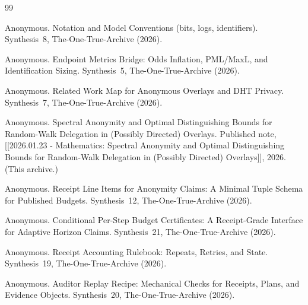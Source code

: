 \documentclass[11pt]{article}
\begin{document}
\begin{thebibliography}{99}\small

Anonymous.
\newblock Notation and Model Conventions (bits, logs, identifiers).
\newblock Synthesis~8, The-One-True-Archive (2026).


Anonymous.
\newblock Endpoint Metrics Bridge: Odds Inflation, PML/MaxL, and Identification Sizing.
\newblock Synthesis~5, The-One-True-Archive (2026).

Anonymous.
\newblock Related Work Map for Anonymous Overlays and DHT Privacy.
\newblock Synthesis~7, The-One-True-Archive (2026).

Anonymous.
\newblock Spectral Anonymity and Optimal Distinguishing Bounds for Random-Walk Delegation in (Possibly Directed) Overlays.
\newblock Published note, [[2026.01.23 - Mathematics: Spectral Anonymity and Optimal Distinguishing Bounds for Random-Walk Delegation in (Possibly Directed) Overlays]], 2026. (This archive.)

Anonymous.
\newblock Receipt Line Items for Anonymity Claims: A Minimal Tuple Schema for Published Budgets.
\newblock Synthesis~12, The-One-True-Archive (2026).

Anonymous.
\newblock Conditional Per-Step Budget Certificates: A Receipt-Grade Interface for Adaptive Horizon Claims.
\newblock Synthesis~21, The-One-True-Archive (2026).

Anonymous.
\newblock Receipt Accounting Rulebook: Repeats, Retries, and State.
\newblock Synthesis~19, The-One-True-Archive (2026).

Anonymous.
\newblock Auditor Replay Recipe: Mechanical Checks for Receipts, Plans, and Evidence Objects.
\newblock Synthesis~20, The-One-True-Archive (2026).

\end{thebibliography}
\end{document}
